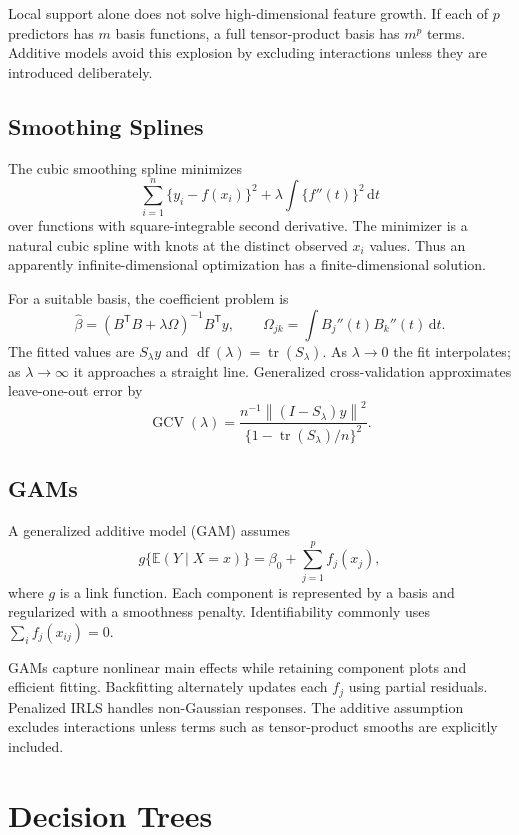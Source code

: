 \documentclass[12pt,oneside]{book}
\numberwithin{equation}{section}
\theoremstyle{definition}
\theoremstyle{plain}
\theoremstyle{remark}
\newcommand{\E}{\mathbb{E}}
\newcommand{\norm}[1]{\left\lVert #1 \right\rVert}
\newcommand{\dd}{\,\mathrm{d}}
\newcommand{\tr}{\operatorname{tr}}
\begin{document}
Local support alone does not solve high-dimensional feature growth. If each of
$p$ predictors has $m$ basis functions, a full tensor-product basis has $m^p$
terms. Additive models avoid this explosion by excluding interactions unless
they are introduced deliberately.

\subsection{Smoothing Splines}

The cubic smoothing spline minimizes
\begin{equation}
 \sum_{i=1}^n\{y_i-f(x_i)\}^2
 +\lambda\int\{f''(t)\}^2\dd t
 \label{eq:smoothing-spline}
\end{equation}
over functions with square-integrable second derivative. The minimizer is a
natural cubic spline with knots at the distinct observed $x_i$ values. Thus an
apparently infinite-dimensional optimization has a finite-dimensional
solution.

For a suitable basis, the coefficient problem is
\[
 \widehat\beta=(B^\mathsf TB+\lambda\Omega)^{-1}B^\mathsf Ty,
 \qquad
 \Omega_{jk}=\int B_j''(t)B_k''(t)\dd t.
\]
The fitted values are $S_\lambda y$ and
$\operatorname{df}(\lambda)=\tr(S_\lambda)$. As $\lambda\to0$ the fit
interpolates; as $\lambda\to\infty$ it approaches a straight line.
Generalized cross-validation approximates leave-one-out error by
\[
 \operatorname{GCV}(\lambda)
 =\frac{n^{-1}\norm{(I-S_\lambda)y}^2}
        {\{1-\tr(S_\lambda)/n\}^2}.
\]

\subsection{GAMs}

A generalized additive model (GAM) assumes
\[
    g\{\E(Y\mid X=x)\}
    =\beta_0+\sum_{j=1}^pf_j(x_j),
\]
where $g$ is a link function. Each component is represented by a basis and
regularized with a smoothness penalty. Identifiability commonly uses
$\sum_i f_j(x_{ij})=0$.

GAMs capture nonlinear main effects while retaining component plots and
efficient fitting. Backfitting alternately updates each $f_j$ using partial
residuals. Penalized IRLS handles non-Gaussian responses. The additive
assumption excludes interactions unless terms such as tensor-product smooths
are explicitly included.

\section{Decision Trees}
\end{document}
